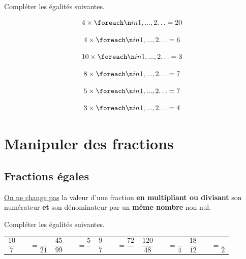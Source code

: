 \documentclass[a4paper]{book}
\begin{document}
\newpage


    \begin{exemple}
        Compléter les égalités suivantes.

            \begin{minipage}{0.3\linewidth}
                \[4\times \points[2] = 20\]

                \[4\times \points[2] = 6\]
            \end{minipage}
            \hfill\vline\hfill
            \begin{minipage}{0.3\linewidth}
                \[10\times \points[2] = 3\]

                \[8\times \points[2] = 7\]
            \end{minipage}
            \hfill\vline\hfill
            \begin{minipage}{0.3\linewidth}
                \[5\times \points[2] = 7\]

                \[3\times \points[2] = 4\]
            \end{minipage}
    \end{exemple}


\section{Manipuler des fractions}
\subsection{Fractions égales}
    \begin{propriete}
        \underline{On ne change pas} la valeur d'une fraction \textbf{en multipliant ou divisant} son numérateur \textbf{et} son dénominateur par un \textbf{même nombre} non nul.
    \end{propriete}

    
    \begin{exemple}
        Compléter les égalités suivantes.

        \medskip
        
        \begin{tabular}{c|c|c|c|c}
            $\dfrac{10}{7}\quad \quad =\dfrac{}{21}$ 
            & $\dfrac{45}{99} \quad \quad = \dfrac{5}{}$ 
            & $\dfrac{9}{7} \quad \quad = \dfrac{72}{}$ 
            & $\dfrac{120}{48} \quad \quad = \dfrac{}{4}$
            & $\dfrac{18}{12} \quad \quad = \dfrac{}{2}$
        \end{tabular}   
    \end{exemple}
\end{document}
